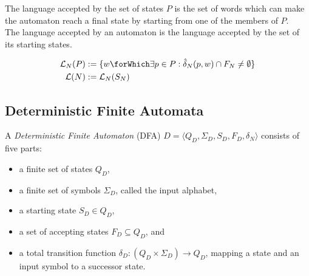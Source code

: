 \begin{definition}
  The language accepted by the set of states $P$ is the set of words which can
  make the automaton reach a final state by starting from one of the members
  of $P$.\\
  The language accepted by an automaton is the language accepted by the set of
  its starting states.

  \begin{align*}
    \mathcal{L}_N(P) &:= \{ w \forWhich \exists p \in P: \hat{\delta}_N(p, w) \cap F_N \neq \emptyset\}\\
    \mathcal{L}(N) &:= \mathcal{L}_N(S_N)
  \end{align*}
\end{definition}

%
%


\subsection{Deterministic Finite Automata}

\begin{definition}
  A \emph{Deterministic Finite Automaton} (DFA)
  $D = \langle Q_D, \Sigma_D, S_D, F_D, \delta_N \rangle$
  consists of five parts:

  \begin{itemize}
    \item a finite set of states $Q_D$,
    \item a finite set of symbols $\Sigma_D$, called the input alphabet,
    \item a starting state $S_D \in Q_D$,
    \item a set of accepting states $F_D \subseteq Q_D$, and
    \item a total transition function
            $\delta_D : (Q_D \times \Sigma_D) \to Q_D$,
             mapping a state and an input symbol to a successor state.
  \end{itemize}

\end{definition}

